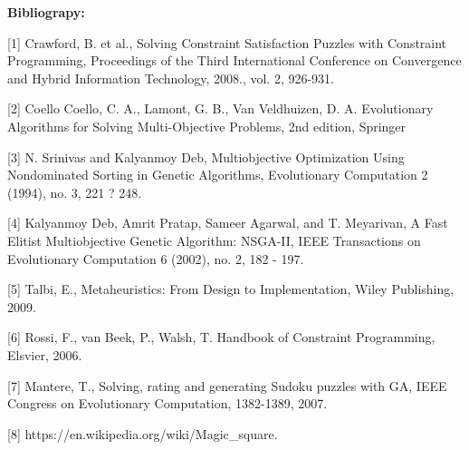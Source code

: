 
\textbf{Bibliograpy:}

[1] Crawford, B. et al., Solving Constraint Satisfaction Puzzles with Constraint Programming, Proceedings of the Third International Conference on Convergence and Hybrid Information Technology, 2008., vol. 2, 926-931.

[2] Coello Coello, C. A., Lamont, G. B., Van Veldhuizen, D. A. Evolutionary Algorithms for Solving Multi-Objective Problems, 2nd edition, Springer

[3] N. Srinivas and Kalyanmoy Deb, Multiobjective Optimization Using Nondominated Sorting in Genetic Algorithms, Evolutionary Computation 2 (1994), no. 3, 221 ? 248.

[4] Kalyanmoy Deb, Amrit Pratap, Sameer Agarwal, and T. Meyarivan, A Fast Elitist Multiobjective Genetic Algorithm: NSGA-II, IEEE Transactions on Evolutionary Computation 6 (2002), no. 2, 182 - 197.

[5] Talbi, E., Metaheuristics: From Design to Implementation, Wiley Publishing, 2009.

[6] Rossi, F., van Beek, P., Walsh, T. Handbook of Constraint Programming, Elsvier, 2006.

[7] Mantere, T., Solving, rating and generating Sudoku puzzles with GA, IEEE Congress on Evolutionary Computation, 1382-1389, 2007.

[8] https://en.wikipedia.org/wiki/Magic_square.
